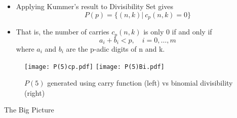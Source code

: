 \documentclass{beamer}
\begin{document}
\begin{frame}
    \begin{itemize}
        \item Applying Kummer's result to Divisibility Set gives 
        \begin{equation*}
            P(p) = \{(n,k) | \ c_p(n,k) = 0\}
        \end{equation*}
        \item That is, the number of carries $c_p(n,k)$ is only $0$ if and only if 
        \begin{equation*}
            a_i + b_i < p, \quad i = 0,\dots,m
        \end{equation*}
        where $a_i$ and $b_i$ are the p-adic digits of n and k. 
    \end{itemize}
\end{frame}

\begin{frame}
    \begin{figure}
        \texttt{[image: P(5)cp.pdf]}
        \hfill
        \texttt{[image: P(5)Bi.pdf]}
        \caption{$P(5)$ generated using carry function (left) vs binomial divisibility (right)}
    \end{figure}
        
\end{frame}

\begin{frame}
    \centering
    \Large
    The Big Picture
\end{frame}
\end{document}
